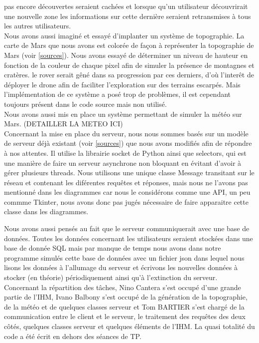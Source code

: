 \documentclass[12pt,a4paper]{scrartcl}
\begin{document}
pas encore découvertes seraient cachées et lorsque qu'un utilisateur découvrirait une nouvelle zone les informations sur cette dernière
seraient retransmises à tous les autres utilisateurs.\\
Nous avons aussi imaginé et essayé d'implanter un système de topographie. La carte de Mars que nous avons est colorée de façon
à représenter la topographie de Mars (voir \ref{sources}). Nous avons essayé de déterminer un niveau de hauteur en fonction de la couleur de chaque pixel
afin de simuler la présence de montagnes et cratères. le rover serait gêné dans sa progression par ces derniers, d'où l'interêt de déployer
le drone afin de faciliter l'exploration sur des terrains escarpés. Mais l'implémentation de ce système a posé trop de problèmes, il est cependant 
toujours présent dans le code source mais non utilisé.\\
Nous avons aussi mis en place un système permettant de simuler la météo sur Mars. (DETAILLER LA METEO ICI)
\\
Concernant la mise en place du serveur, nous nous sommes basés sur un modèle de serveur déjà existant (voir \ref{sources})
que nous avons modifiés afin de répondre à nos attentes. Il utilise la librairie socket de Python ainsi que selectors, qui est 
une manière de faire un serveur asynchrone non bloquant en évitant d'avoir à gérer plusieurs threads.
Nous utilisons une unique classe Message transitant sur le réseau et contenant les diférentes requêtes et réponses, mais nous
ne l'avons pas mentionné dans les diagrammes car nous le considérons comme une API, un peu commme Tkinter, nous avons donc pas jugés
nécessaire de faire apparaitre cette classe dans les diagrammes.

Nous avons aussi pensés au fait que le serveur communiquerait avec une base de données. Toutes les données concernant les utilisateurs seraient stockées dans une base de donnée SQL
mais par manque de temps nous avons dans notre programme simulés cette base de données avec un fichier json dans lequel nous lisons les données à l'allumage du serveur et écrivons les nouvelles
données à stocker (en théorie) périodiquement ainsi qu'à l'extinction du serveur.\\
Concernant la répartition des tâches, Nino Cantera s'est occupé d'une grande partie de l'IHM, Ivano Balbony s'est occupé de la génération de la topographie, de la météo et de quelques 
classes serveur et Tom BARTIER s'est chargé de la communication entre le client et le serveur, le traitement des requêtes des deux côtés, quelques classes serveur et quelques éléments de l'IHM.
La quasi totalité du code a été écrit en dehors des séances de TP.
\end{document}
